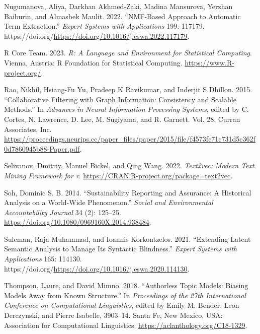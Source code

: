 \documentclass[
]{article}
\newlength{\cslhangindent}
\newlength{\cslentryspacingunit} %
\newenvironment{CSLReferences}[2] %
 {%
  \setlength{\parindent}{0pt}
  \ifodd #1
  \let\oldpar\par
  \def\par{\hangindent=\cslhangindent\oldpar}
  \fi
  \setlength{\parskip}{#2\cslentryspacingunit}
 }%
 {}
\begin{document}
\begin{CSLReferences}{1}{0}
\leavevmode{}%
Nugumanova, Aliya, Darkhan Akhmed-Zaki, Madina Mansurova, Yerzhan Baiburin, and Almasbek Maulit. 2022. {``NMF-Based Approach to Automatic Term Extraction.''} \emph{Expert Systems with Applications} 199: 117179. https://doi.org/\url{https://doi.org/10.1016/j.eswa.2022.117179}.

\leavevmode{}%
R Core Team. 2023. \emph{R: A Language and Environment for Statistical Computing}. Vienna, Austria: R Foundation for Statistical Computing. \url{https://www.R-project.org/}.

\leavevmode{}%
Rao, Nikhil, Hsiang-Fu Yu, Pradeep K Ravikumar, and Inderjit S Dhillon. 2015. {``Collaborative Filtering with Graph Information: Consistency and Scalable Methods.''} In \emph{Advances in Neural Information Processing Systems}, edited by C. Cortes, N. Lawrence, D. Lee, M. Sugiyama, and R. Garnett. Vol. 28. Curran Associates, Inc. \url{https://proceedings.neurips.cc/paper_files/paper/2015/file/f4573fc71c731d5c362f0d7860945b88-Paper.pdf}.

\leavevmode{}%
Selivanov, Dmitriy, Manuel Bickel, and Qing Wang. 2022. \emph{Text2vec: Modern Text Mining Framework for r}. \url{https://CRAN.R-project.org/package=text2vec}.

\leavevmode{}%
Soh, Dominic S. B. 2014. {``Sustainability Reporting and Assurance: A Historical Analysis on a World-Wide Phenomenon.''} \emph{Social and Environmental Accountability Journal} 34 (2): 125--25. \url{https://doi.org/10.1080/0969160X.2014.938484}.

\leavevmode{}%
Suleman, Raja Muhammad, and Ioannis Korkontzelos. 2021. {``Extending Latent Semantic Analysis to Manage Its Syntactic Blindness.''} \emph{Expert Systems with Applications} 165: 114130. https://doi.org/\url{https://doi.org/10.1016/j.eswa.2020.114130}.

\leavevmode{}%
Thompson, Laure, and David Mimno. 2018. {``Authorless Topic Models: Biasing Models Away from Known Structure.''} In \emph{Proceedings of the 27th International Conference on Computational Linguistics}, edited by Emily M. Bender, Leon Derczynski, and Pierre Isabelle, 3903--14. Santa Fe, New Mexico, USA: Association for Computational Linguistics. \url{https://aclanthology.org/C18-1329}.


\end{CSLReferences}
\end{document}

